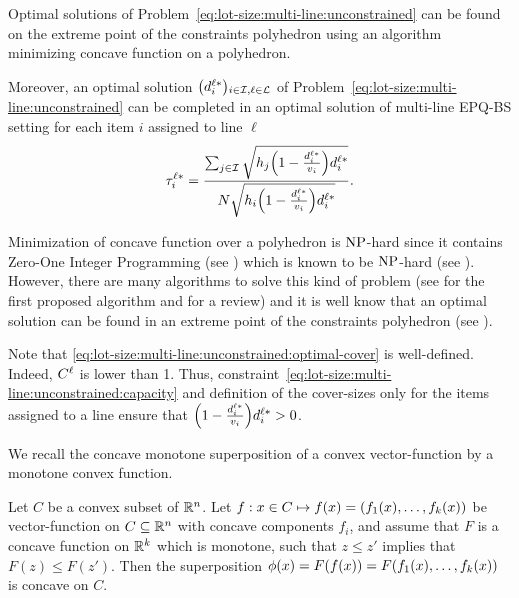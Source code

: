 \begin{thm}\label{thm:lot-size:multi-line:unconstrained:optimality}
Optimal solutions of Problem~\eqref{eq:lot-size:multi-line:unconstrained} can be found on the extreme point of the constraints polyhedron using an algorithm minimizing concave function on a polyhedron.

Moreover, an optimal solution $\bracket{\demand_i^{\ell*}}_{i\in\REF,\ell\in\lines}$ of Problem~\eqref{eq:lot-size:multi-line:unconstrained} can be completed in an optimal solution of multi-line EPQ-BS setting for each item $i$ assigned to line $\ell$
\begin{equation}\label{eq:lot-size:multi-line:unconstrained:optimal-cover}
  \cover_i^{\ell*}= \frac{\sum_{j\in\REF}\sqrt{\holding_j\bracket{1-\frac{\demand_i^{\ell*}}{\rate_i}}\demand_i^{\ell*}}}{\nbsetups\sqrt{\holding_i\bracket{1-\frac{\demand_i^{\ell*}}{\rate_i}}\demand_i^{\ell*}}}.
\end{equation}
\end{thm}


Minimization of concave function over a polyhedron is $\operatorname{NP}$-hard since it contains Zero-One Integer Programming (see \cite{Raghavachari1969}) which is known to be $\operatorname{NP}$-hard (see \cite{Garey1979}).
However, there are many algorithms to solve this kind of problem (see \cite{Tuy1964} for the first proposed algorithm and \cite{Benson1998} for a review) and it is well know that an optimal solution can be found in an extreme point of the constraints polyhedron (see \cite{Benson1985}).


Note that \cref{eq:lot-size:multi-line:unconstrained:optimal-cover} is well-defined.
Indeed, $C^{\ell}$ is lower than 1.
Thus, constraint~\eqref{eq:lot-size:multi-line:unconstrained:capacity} and definition of the cover-sizes only for the items assigned to a line ensure that $\bracket{1-\frac{\demand_i^{\ell*}}{\rate_i}}\demand_i^{\ell*}>0$.


We recall the concave monotone superposition of a convex vector-function by a monotone convex function.


\begin{lem}\label{lem:concave-monotone-superposition}
Let $C$ be a convex subset of $\mathbb{R}^n$.
Let $f:x\in C \mapsto f(x) = \bracket{f_1(x),\ldots,f_k(x)}$ be vector-function on $C\subseteq\mathbb{R}^n$ with concave components $f_i$, and assume that $F$ is a concave function on $\mathbb{R}^k$ which is monotone, \ie such that $z\le z'$ implies that $F(z)\le F(z')$.
Then the superposition $\phi(x) = F\bracket{f(x)}=F\bracket{f_1(x),\ldots,f_k(x)}$ is concave on $C$.
\end{lem}


